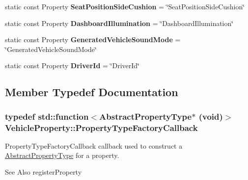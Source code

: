 \begin{DoxyCompactItemize}
\item 
\hypertarget{classVehicleProperty_ad6f1eef532c05b0fa36092d934601ed5}{static const Property {\bfseries Seat\-Position\-Side\-Cushion} = \char`\"{}Seat\-Position\-Side\-Cushion\char`\"{}}\label{classVehicleProperty_ad6f1eef532c05b0fa36092d934601ed5}

\item 
\hypertarget{classVehicleProperty_a7d923b6b7a8f3a27e75aa6e8a0aa1057}{static const Property {\bfseries Dashboard\-Illumination} = \char`\"{}Dashboard\-Illumination\char`\"{}}\label{classVehicleProperty_a7d923b6b7a8f3a27e75aa6e8a0aa1057}

\item 
\hypertarget{classVehicleProperty_a213eda302bd74172fda1e408d72079f6}{static const Property {\bfseries Generated\-Vehicle\-Sound\-Mode} = \char`\"{}Generated\-Vehicle\-Sound\-Mode\char`\"{}}\label{classVehicleProperty_a213eda302bd74172fda1e408d72079f6}

\item 
\hypertarget{classVehicleProperty_a5396b973e6511c2cd31b1a7b9f83d69c}{static const Property {\bfseries Driver\-Id} = \char`\"{}Driver\-Id\char`\"{}}\label{classVehicleProperty_a5396b973e6511c2cd31b1a7b9f83d69c}

\end{DoxyCompactItemize}


\subsection{Member Typedef Documentation}
\hypertarget{classVehicleProperty_a6fdd075ce5b867b571020fcdc723ddcf}{
\subsubsection[{Property\-Type\-Factory\-Callback}]{\setlength{\rightskip}{0pt plus 5cm}typedef std\-::function$<${\bf Abstract\-Property\-Type}$\ast$ (void)$>$ {\bf Vehicle\-Property\-::\-Property\-Type\-Factory\-Callback}}}\label{classVehicleProperty_a6fdd075ce5b867b571020fcdc723ddcf}


Property\-Type\-Factory\-Callback callback used to construct a \hyperlink{classAbstractPropertyType}{Abstract\-Property\-Type} for a property. 

\begin{DoxySeeAlso}{See Also}
register\-Property 
\end{DoxySeeAlso}


